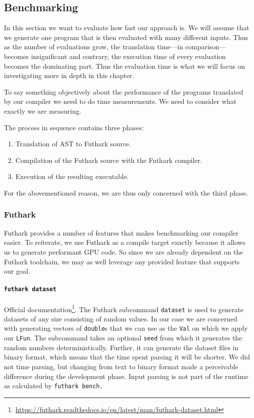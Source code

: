 \subsection{Benchmarking}
In this section we want to evaluate how fast our approach is.
We will assume that we generate one program that is
then evaluated with many different inputs.  Thus as the number of evaluations
grow, the translation time---in comparison---becomes insignificant and contrary,
the execution time of every evaluation becomes the dominating part.  Thus the
evaluation time is what we will focus on investigating more in depth in this
chapter.

To say something objectively about the performance of the programs translated by
our compiler we need to do time measurements.  We need to consider what exactly
we are measuring.

The process in sequence contains three phases:
\begin{enumerate}
  \item Translation of \tad AST to Futhark source.
  \item Compilation of the Futhark source with the Futhark compiler.
  \item Execution of the resulting executable.
\end{enumerate}
For the abovementioned reason, we are thus only concerned with the third phase.

\subsubsection{Futhark}  Futhark provides a number of features that makes
benchmarking our compiler easier.  To reiterate, we use Futhark as a compile
target exactly because it allows us to generate performant GPU code.  So since
we are already dependent on the Futhark toolchain, we may as well leverage any
provided feature that supports our goal.

\paragraph{\texttt{futhark dataset}}
Official documentation\footnote{\url{https://futhark.readthedocs.io/en/latest/man/futhark-dataset.html}}.
The Futhark subcommand \texttt{dataset} is used to generate datasets of any size
consisting of random values.  In our case we are concerned with generating
vectors of \texttt{double}s that we can use as the \texttt{Val} on which we apply
our \texttt{LFun}.  The subcommand takes an optional \texttt{seed} from which
it generates the random numbers deterministically.  Further, it can generate the
dataset files in binary format, which means that the time spent parsing it will be shorter.
We did not time parsing, but changing from text to binary format made a
perceivable difference during the development phase. Input parsing is not part of the runtime as calculated by \tt{futhark bench}.

